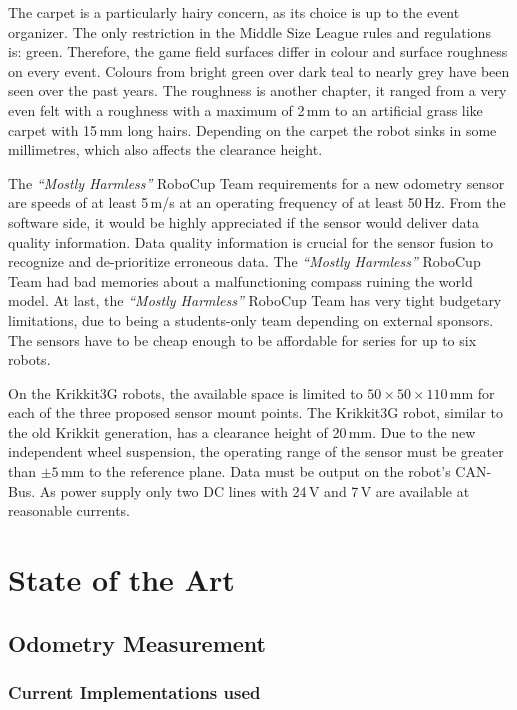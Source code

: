 \documentclass[12pt,a4paper]{article}
\newcommand{\MH}{\emph{``Mostly Harmless''} RoboCup Team\xspace}
\newcommand{\MSL}{Middle Size League\xspace}
\begin{document}
The carpet is a particularly hairy concern, as its choice is up to the event organizer.
The only restriction in the \MSL rules and regulations~\cite{msl-rules} is: green.
Therefore, the game field surfaces differ in colour and surface roughness on every event.
Colours from bright green over dark teal to nearly grey have been seen over the past years.
The roughness is another chapter, it ranged from a very even felt with a roughness with a maximum of 2\,mm to an artificial grass like carpet with 15\,mm long hairs. 
Depending on the carpet the robot sinks in some millimetres, which also affects the clearance height.

The \MH requirements for a new odometry sensor are speeds of at least 5\,m/s at an operating frequency of at least 50\,Hz.
From the software side, it would be highly appreciated if the sensor would deliver data quality information.
Data quality information is crucial for the sensor fusion to recognize and de-prioritize erroneous data.
The \MH had bad memories about a malfunctioning compass ruining the world model.
At last, the \MH has very tight budgetary limitations, due to being a students-only team depending on external sponsors.
The sensors have to be cheap enough to be affordable for series for up to six robots.


On the Krikkit3G robots, the available space is limited to $50\times50\times110$\,mm for each of the three proposed sensor mount points.
The Krikkit3G robot, similar to the old Krikkit generation, has a clearance height of 20\,mm.
Due to the new independent wheel suspension, the operating range of the sensor must be greater than $\pm 5$\,mm to the reference plane.
Data must be output on the robot's CAN-Bus.
As power supply only two DC lines with 24\,V and 7\,V are available at reasonable currents.





\clearpage
\section{State of the Art}

\subsection{Odometry Measurement}

\subsubsection{Current Implementations used}
\end{document}

